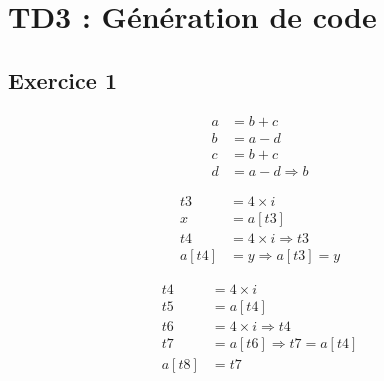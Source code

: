 \chapter{TD3 : Génération de code}

\section{Exercice 1}
\begin{align*}
a &= b + c\\
b &= a - d\\
c &= b + c\\
d &= a - d \Rightarrow b
\end{align*}

\begin{align*}
t3 &= 4 \times i\\
x &= a[t3]\\
t4 &= 4 \times i \Rightarrow t3\\
a[t4] &= y \Rightarrow a[t3] = y
\end{align*}

\begin{align*}
t4 &= 4 \times i\\
t5 &= a[t4]\\
t6 &= 4 \times i \Rightarrow t4\\
t7 &= a[t6] \Rightarrow t7 = a[t4]\\
a[t8] &= t7
\end{align*}

